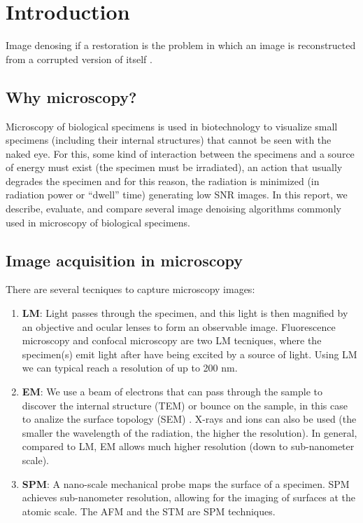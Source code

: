 \chapter{Introduction}

Image denosing if a restoration is the problem in which an image is
reconstructed from a corrupted version of itself
\cite{BUCHHOLZ2019277}.

\section{Why microscopy?}
Microscopy of biological specimens is used in biotechnology to
visualize small specimens (including their internal structures) that
cannot be seen with the naked eye. For this, some kind of interaction
between the specimens and a source of energy must exist (the specimen
must be irradiated), an action that usually degrades the specimen and
for this reason, the radiation is minimized (in radiation power or
``dwell'' time) generating low SNR images. In this report, we describe,
evaluate, and compare several image denoising algorithms commonly used
in microscopy of biological specimens.

\section{Image acquisition in microscopy}

There are several tecniques to capture microscopy images:

\begin{enumerate}
  \item \textbf{\gls{LM}}: Light passes through the specimen, and this light
  is then magnified by an objective and ocular lenses to form an
  observable image. Fluorescence microscopy and confocal microscopy
  are two \gls{LM} tecniques, where the specimen(s) emit light after
  have being excited by a source of light. Using \gls{LM} we can
  typical reach a resolution of up to 200 nm.

\item \textbf{\gls{EM}}: We use a beam of electrons that can pass
  through the sample to discover the internal structure (\gls{TEM}) or
  bounce on the sample, in this case to analize the surface topology
  (\gls{SEM}) \cite{timischl2012statistical}. X-rays and ions can also
  be used (the smaller the wavelength of the radiation, the higher the
  resolution). In general, compared to \gls{LM}, \gls{EM} allows much
  higher resolution (down to sub-nanometer scale).

\item \textbf{\gls{SPM}}: A nano-scale mechanical probe maps the surface of a
  specimen. \gls{SPM} achieves sub-nanometer resolution, allowing for
  the imaging of surfaces at the atomic scale. The \gls{AFM} and the
  \gls{STM} are \gls{SPM} techniques.

\end{enumerate}
  
